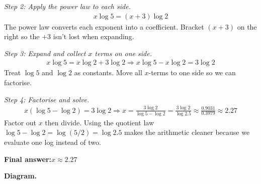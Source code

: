 \documentclass[11pt]{article}
\begin{document}
\textit{Step 2: Apply the power law to each side.}
\[\begin{gathered}
x\log 5 = (x+3)\log 2
\end{gathered}\]
The power law converts each exponent into a coefficient. Bracket \( (x+3) \) on the right so the \( +3 \) isn't lost when expanding.

\textit{Step 3: Expand and collect \( x \) terms on one side.}
\[\begin{gathered}
x\log 5 = x\log 2 + 3\log 2 \Rightarrow x\log 5 - x\log 2 = 3\log 2
\end{gathered}\]
Treat \( \log 5 \) and \( \log 2 \) as constants. Move all \( x \)-terms to one side so we can factorise.

\textit{Step 4: Factorise and solve.}
\[\begin{gathered}
x(\log 5 - \log 2) = 3\log 2 \Rightarrow x = \frac{3\log 2}{\log 5 - \log 2} = \frac{3\log 2}{\log 2.5} \approx \frac{0.9031}{0.3979} \approx 2.27
\end{gathered}\]
Factor out \( x \) then divide. Using the quotient law \( \log 5 - \log 2 = \log(5/2) = \log 2.5 \) makes the arithmetic cleaner because we evaluate one log instead of two.

\begin{answerbox}
\textbf{Final answer:}\quad \(\displaystyle  x \approx 2.27 \)
\end{answerbox}
\textbf{Diagram.}
\end{document}

